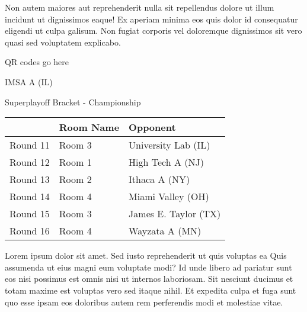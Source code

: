 \documentclass{article}%
\begin{document}
\newline%
    Non autem maiores aut reprehenderit nulla sit repellendus dolore ut illum incidunt ut dignissimos eaque! Ex aperiam minima eos quis dolor id consequatur eligendi ut culpa galisum. Non fugiat corporis vel doloremque dignissimos sit vero quasi sed voluptatem explicabo.\newline%
\newline%
\vspace*{30pt}%
\begin{center}%
\begin{Huge}%
QR codes go here%
\end{Huge}%
\end{center}%
\newpage%
\begin{center}%
\begin{Huge}%
IMSA A (IL)%
\end{Huge}%
\vspace*{8pt}%
\linebreak%
\begin{Large}%
Superplayoff Bracket {-} Championship%
\end{Large}%
\end{center}%
%
\begin{tabularx}{\textwidth}{|c|Y|Y|}%
\hline%
&Room Name&Opponent\\%
\hline%
Round 11&Room 3&University Lab (IL)\\%
Round 12&Room 1&High Tech A (NJ)\\%
Round 13&Room 2&Ithaca A (NY)\\%
Round 14&Room 4&Miami Valley (OH)\\%
Round 15&Room 3&James E. Taylor (TX)\\%
Round 16&Room 4&Wayzata A (MN)\\%
\hline%
\end{tabularx}%
\vspace*{8pt}%
\linebreak%
\newline%
\newline%
    Lorem ipsum dolor sit amet. Sed iusto reprehenderit ut quis voluptas ea Quis assumenda ut eius magni eum voluptate modi? Id unde libero ad pariatur sunt eos nisi possimus est omnis nisi ut internos laboriosam. Sit nesciunt ducimus et totam maxime est voluptas vero sed itaque nihil. Et expedita culpa et fuga sunt quo esse ipsam eos doloribus autem rem perferendis modi et molestiae vitae.\newline%
\newline%
\end{document}
